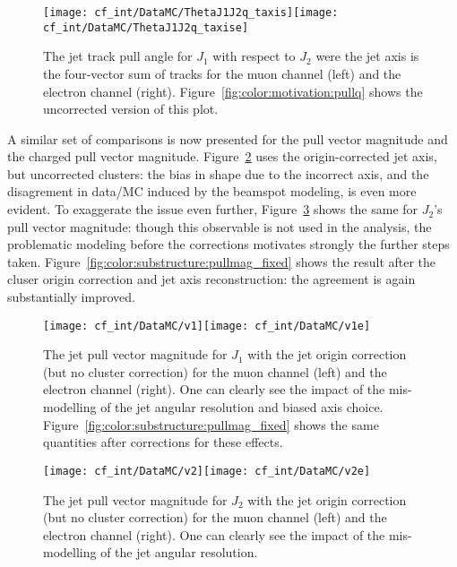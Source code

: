 \begin{figure}[h!]
\begin{center}
\texttt{[image: cf\_int/DataMC/ThetaJ1J2q\_taxis]}\texttt{[image: cf\_int/DataMC/ThetaJ1J2q\_taxise]}
 \caption{The jet track pull angle for $J_1$ with respect to $J_2$ were the jet axis is the four-vector sum of tracks for the muon channel (left) and the electron channel (right).  Figure~\ref{fig:color:motivation:pullq} shows the uncorrected version of this plot.}
 \label{fig:color:substructure:pullq_fixed}
  \end{center}
\end{figure}

A similar set of comparisons is now presented for the pull vector magnitude and the charged pull vector magnitude. Figure~\ref{fig:color:substructure:pullmag} uses the origin-corrected jet axis, but uncorrected clusters: the bias in shape due to the incorrect axis, and the disagrement in data/MC induced by the beamspot modeling, is even more evident. To exaggerate the issue even further, Figure~\ref{fig:color:substructure:pullmag_2} shows the same for $J_2$'s pull vector magnitude: though this observable is not used in the analysis, the problematic modeling before the corrections motivates strongly the further steps taken. Figure~\ref{fig:color:substructure:pullmag_fixed} shows the result after the cluser origin correction and jet axis reconstruction: the agreement is again substantially improved.



\begin{figure}[h!]
\begin{center}
\texttt{[image: cf\_int/DataMC/v1]}\texttt{[image: cf\_int/DataMC/v1e]}
 \caption{The jet pull vector magnitude for $J_1$ with the jet origin correction (but no cluster correction) for the muon channel (left) and the electron channel (right). One can clearly see the impact of the mis-modelling of the jet angular resolution and biased axis choice. Figure~\ref{fig:color:substructure:pullmag_fixed} shows the same quantities after corrections for these effects.}
 \label{fig:color:substructure:pullmag}
  \end{center}
\end{figure}

\begin{figure}[h!]
\begin{center}
\texttt{[image: cf\_int/DataMC/v2]}\texttt{[image: cf\_int/DataMC/v2e]}
 \caption{The jet pull vector magnitude for $J_2$ with the jet origin correction (but no cluster correction) for the muon channel (left) and the electron channel (right). One can clearly see the impact of the mis-modelling of the jet angular resolution.}
 \label{fig:color:substructure:pullmag_2}
  \end{center}
\end{figure}

